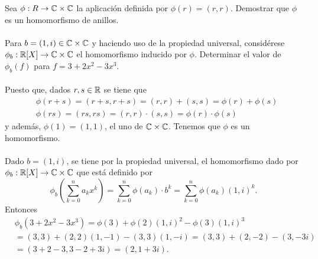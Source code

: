 \documentclass[12pt]{article}
\begin{document}
    \begin{ejercicio}[1.25 puntos]
        Sea $\phi: R \rightarrow {\mathbb{C}} \times  {\mathbb{C}} $ la aplicación definida por $\phi(r) = (r, r).$ Demostrar que $\phi$ es un homomorfismo de anillos. \\ \\
        Para $b = (1, i) \in {\mathbb{C}} \times {\mathbb{C}}$ y haciendo uso de la propiedad universal, considérese $\phi_b: {\mathbb{R}}[X] \rightarrow {\mathbb{C}} \times {\mathbb{C}}$ el homomorfismo inducido por $\phi$. Determinar el valor de $\phi_b(f)$ para $f = 3 + 2x^2 - 3x^3$. \\ \\
        Puesto que, dados $r, s \in {\mathbb{R}}$ se tiene que
        \begin{align*}
            & \phi(r+s) = (r+s, r+s) = (r, r)+ (s,s) = \phi(r) + \phi(s) \\
            & \phi(rs) = (rs, rs) = (r, r) \cdot (s,s) = \phi(r) \cdot  \phi(s)
        \end{align*}
        y además, $\phi(1) = (1, 1)$, el uno de ${\mathbb{C}} \times {\mathbb{C}}$. Tenemos que $\phi$ es un homomorfismo. \\ \\
        Dado $b = (1, i)$, se tiene por la propiedad universal, el homomorfismo dado por $\phi_b : {\mathbb{R}}[X] \rightarrow {\mathbb{C}} \times {\mathbb{C}}$ que está definido por
        \begin{equation*}
            \phi_b\left(\sum_{k=0}^{n} a_{k}x^{k}\right) = \sum_{k=0}^{n} \phi(a_k) \cdot b^k = \sum_{k=0}^{n} \phi(a_k) (1, i)^k.
        \end{equation*}
        Entonces
        \begin{align*}
            & \phi_b(3+2x^2 - 3x^3) = \phi(3) + \phi(2)(1, i)^2 - \phi(3)(1, i)^3 \\
            & = (3, 3) + (2, 2)(1, -1) - (3, 3)(1, -i) = (3, 3) + (2, -2) - (3, -3i) \\
            & = (3 + 2 - 3, 3 -2 + 3i) = (2, 1 +3i).
        \end{align*}
    \end{ejercicio}
    
\end{document}
